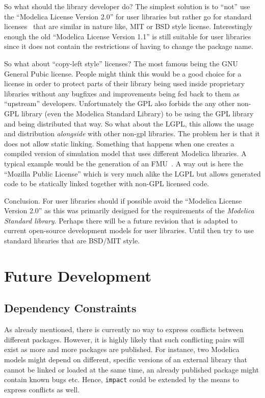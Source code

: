 \documentclass[11pt,a4paper,twocolumn]{article}
\newcommand{\code}[1]{\texttt{#1}} %
\begin{document}
So what should the library developer do? The simplest solution is to
``not'' use the ``Modelica License Version 2.0'' for user libraries
but rather go for standard licenses~\parencite{lic} that are similar
in  nature like, MIT or BSD style license. Interestingly enough the
old ``Modelica License Version 1.1'' is still suitable for user
libraries since it does not contain the restrictions of having to
change the package name.

So what about ``copy-left style'' licenses? The most famous being the
GNU General Pubic license. People might think this
would be a good choice for a license in order
to protect parts of their library being used inside proprietary
libraries without any bugfixes and improvements being fed back to them
as ``upstream'' developers. Unfortunately the GPL also forbids the any
other non-GPL library (even the Modelica Standard Library) to be using
the GPL library and being distributed that way. So what about the
LGPL, this allows the usage and distribution \emph{alongside} with
other non-gpl libraries. The problem her is that it does not allow
static linking. Something that happens when one creates a compiled
version of simulation model that uses different Modelica libraries.
A typical example would be the generation of an FMU~\parencite{FMI}.
A way out is here the ``Mozilla Public License'' which is very much
alike the LGPL but allows generated code to be statically linked
together with non-GPL licensed code.

Conclusion. For user libraries should if possible avoid the ``Modelica
License Version 2.0'' as this was primarily designed for the
requirements of the \emph{Modelica Standard library}. Perhaps there
will be a future revision that is adapted to current open-source
development models for user libraries. Until then try to use standard
libraries that are BSD/MIT style.


\section{Future Development}

\subsection{Dependency Constraints}
As already mentioned, there is currently no way to express conflicts
between different packages.  However, it is highly likely that such
conflicting pairs will exist as more and more packages are published.
For instance, two Modelica models might depend on different, specific
versions of an external library that cannot be linked or loaded at the
same time, an already published package might contain known bugs etc.
Hence, \code{impact} could be extended by the means to express
conflicts as well.
\end{document}
